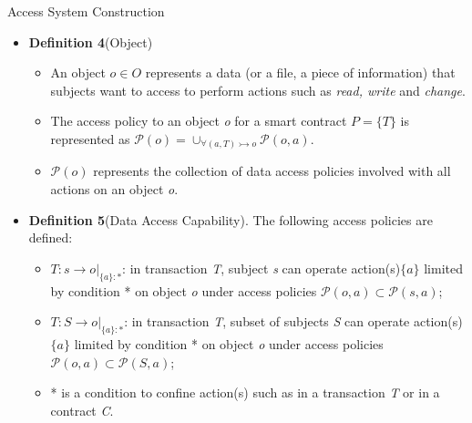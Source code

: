 \documentclass[11pt]{beamer}
\begin{document}
\begin{frame}[allowframebreaks]{Access System Construction}
\begin{itemize}
\begin{itemize}
	\end{itemize}
\break
\item \textbf{Definition 4}(Object)
	\begin{itemize}
	\item An object $o \in O$ represents a data (or a file, a piece of information) that subjects want to access to perform actions such as \textit{read, write} and \textit{change}.
	\item The access policy to an object \textit{o} for a smart contract $P = \{T\}$ is represented as $\mathcal{P}(o) = \cup_{\forall(a, T) \rightarrowtail o} \mathcal{P}(o, a)$.
	\item $\mathcal{P}(o)$ represents the collection of data access policies involved with all actions on an object \textit{o}.
	\end{itemize}
\item \textbf{Definition 5}(Data Access Capability). The following access policies are defined:
	\begin{itemize}
	\item $T:s \rightarrow o|_{\{a\}:*}$: in transaction \textit{T}, subject \textit{s} can operate action(s)$\{a\}$ limited by condition * on object \textit{o} under access policies $\mathcal{P}(o,a) \subset \mathcal{P}(s,a)$;
	\item $T:S \rightarrow o|_{\{a\}:*}$: in transaction \textit{T}, subset of subjects \textit{S} can operate action(s)$\{a\}$ limited by condition * on object \textit{o} under access policies $\mathcal{P}(o,a) \subset \mathcal{P}(S,a)$;
	\item * is a condition to confine action(s) such as in a transaction \textit{T} or in a contract \textit{C}.
	\end{itemize}
\end{itemize}
\end{frame}
\end{document}
